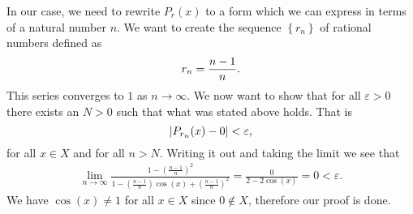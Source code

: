 \documentclass[a4paper]{article}
\begin{document}
In our case, we need to rewrite $P_r(x)$ to a form which we can express in terms of a natural number $n$.
We want to create the sequence $\left\{ r_n \right\}$ of rational numbers defined as
\begin{equation}
  \notag
  r_n = \frac{n - 1}{n}.
\end{equation}
This series converges to $1$ as $n \rightarrow \infty$. We now want to show that for all $\varepsilon>0$ there exists an $N > 0$ such that what was stated above holds. That is
\begin{equation}
  \notag
  |P_{r_n}(x) - 0| < \varepsilon, 
\end{equation}
for all $x \in X$ and for all $n > N$.
Writing it out and taking the limit we see that
\begin{align*}
  \lim\limits_{n\rightarrow\infty}\frac{1 - \left(\frac{n - 1}{n}\right)^2}{1 - \left( \frac{n-1}{n} \right)\cos(x) + \left( \frac{n-1}{n} \right)^{2}} = \frac{0}{2 - 2\cos(x)} = 0 < \varepsilon.
\end{align*}
We have $\cos(x) \neq 1$ for all $x \in X$ since $0 \notin X$, therefore our proof is done.
\end{document}
